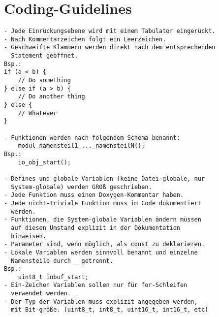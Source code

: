 \chapter{Coding-Guidelines \label{appendix_cg}}
\begin{verbatim}
- Jede Einrückungsebene wird mit einem Tabulator eingerückt.
- Nach Kommentarzeichen folgt ein Leerzeichen.
- Geschweifte Klammern werden direkt nach dem entsprechenden
  Statement geöffnet.
Bsp.:
if (a < b) {
    // Do something
} else if (a > b) {
    // Do another thing
} else {
    // Whatever
}

- Funktionen werden nach folgendem Schema benannt:
    modul_namensteil1_..._namensteilN();
Bsp.:
    io_obj_start();

- Defines und globale Variablen (keine Datei-globale, nur
  System-globale) werden GROß geschrieben.
- Jede Funktion muss einen Doxygen-Kommentar haben.
- Jede nicht-triviale Funktion muss im Code dokumentiert
  werden.
- Funktionen, die System-globale Variablen ändern müssen
  auf diesen Umstand explizit in der Dokumentation
  hinweisen.
- Parameter sind, wenn möglich, als const zu deklarieren.
- Lokale Variablen werden sinnvoll benannt und einzelne
  Namensteile durch _ getrennt.
Bsp.:
    uint8_t inbuf_start;
- Ein-Zeichen Variablen sollen nur für for-Schleifen
  verwendet werden.
- Der Typ der Variablen muss explizit angegeben werden,
  mit Bit-größe. (uint8_t, int8_t, uint16_t, int16_t, etc)
\end{verbatim}
